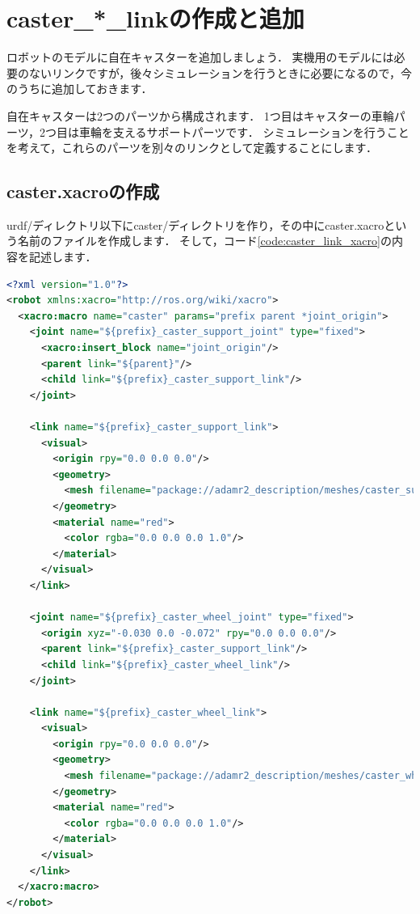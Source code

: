 \documentclass[{../../master}]{subfiles}
\begin{document}
\section{\textsf{caster\_*\_link}の作成と追加}

ロボットのモデルに自在キャスターを追加しましょう．
実機用のモデルには必要のないリンクですが，後々シミュレーションを行うときに必要になるので，今のうちに追加しておきます．

自在キャスターは2つのパーツから構成されます．
1つ目はキャスターの車輪パーツ，2つ目は車輪を支えるサポートパーツです．
シミュレーションを行うことを考えて，これらのパーツを別々のリンクとして定義することにします．

\subsection{\textsf{caster.xacro}の作成}

\textsf{urdf/}ディレクトリ以下に\textsf{caster/}ディレクトリを作り，その中に\textsf{caster.xacro}という名前のファイルを作成します．
そして，コード\ref{code:caster_link_xacro}の内容を記述します．

\begin{lstlisting}[language=XML, label=code:caster_link_xacro, caption=\textsf{caster.xacro}]
<?xml version="1.0"?>
<robot xmlns:xacro="http://ros.org/wiki/xacro">
  <xacro:macro name="caster" params="prefix parent *joint_origin">
    <joint name="${prefix}_caster_support_joint" type="fixed">
      <xacro:insert_block name="joint_origin"/>
      <parent link="${parent}"/>
      <child link="${prefix}_caster_support_link"/>
    </joint>
    
    <link name="${prefix}_caster_support_link">
      <visual>
        <origin rpy="0.0 0.0 0.0"/>
        <geometry>
          <mesh filename="package://adamr2_description/meshes/caster_support_link.STL"/>
        </geometry>
        <material name="red">
          <color rgba="0.0 0.0 0.0 1.0"/>
        </material>
      </visual>
    </link>

    <joint name="${prefix}_caster_wheel_joint" type="fixed">
      <origin xyz="-0.030 0.0 -0.072" rpy="0.0 0.0 0.0"/>
      <parent link="${prefix}_caster_support_link"/>
      <child link="${prefix}_caster_wheel_link"/>
    </joint>

    <link name="${prefix}_caster_wheel_link">
      <visual>
        <origin rpy="0.0 0.0 0.0"/>
        <geometry>
          <mesh filename="package://adamr2_description/meshes/caster_wheel_link.STL"/>
        </geometry>
        <material name="red">
          <color rgba="0.0 0.0 0.0 1.0"/>
        </material>
      </visual>
    </link>
  </xacro:macro>
</robot>
\end{lstlisting}
\end{document}
